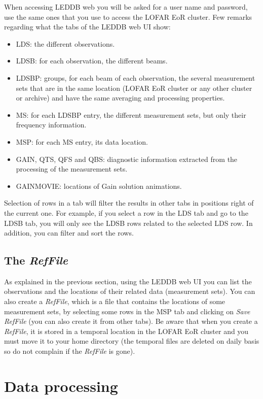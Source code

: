 \documentclass[a4paper,11pt]{article}
\begin{document}
When accessing LEDDB web you will be asked for a user name and password, use the same ones that you use to access the LOFAR EoR cluster. Few remarks regarding what the tabs of the LEDDB web UI show:

\begin{itemize}
	\item LDS: the different observations.
	\item LDSB: for each observation, the different beams.
	\item LDSBP: groups, for each beam of each observation, the several measurement sets that are in the same location (LOFAR EoR cluster or any other cluster or archive) and have the same averaging and processing properties.
	\item MS: for each LDSBP entry, the different measurement sets, but only their frequency information.
	\item MSP: for each MS entry, its data location.
	\item GAIN, QTS, QFS and QBS: diagnostic information extracted from the processing of the measurement sets.
	\item GAINMOVIE: locations of Gain solution animations.
\end{itemize}

Selection of rows in a tab will filter the results in other tabs in positions right of the current one. For example, if you select a row in the LDS tab and go to the LDSB tab, you will only see the LDSB rows related to the selected LDS row. In addition, you can filter and sort the rows.

\subsection*{The \textit{RefFile}}

As explained in the previous section, using the LEDDB web UI you can list the observations and the locations of their related data (measurement sets). You can also create a \textit{RefFile}, which is a file that contains the locations of some measurement sets, by selecting some rows in the MSP tab and clicking on \textit{Save RefFile} (you can also create it from other tabs). Be aware that when you create a \textit{RefFile}, it is stored in a temporal location in the LOFAR EoR cluster and you must move it to your home directory (the temporal files are deleted on daily basis so do not complain if the \textit{RefFile} is gone).


\section{Data processing}
\end{document}
